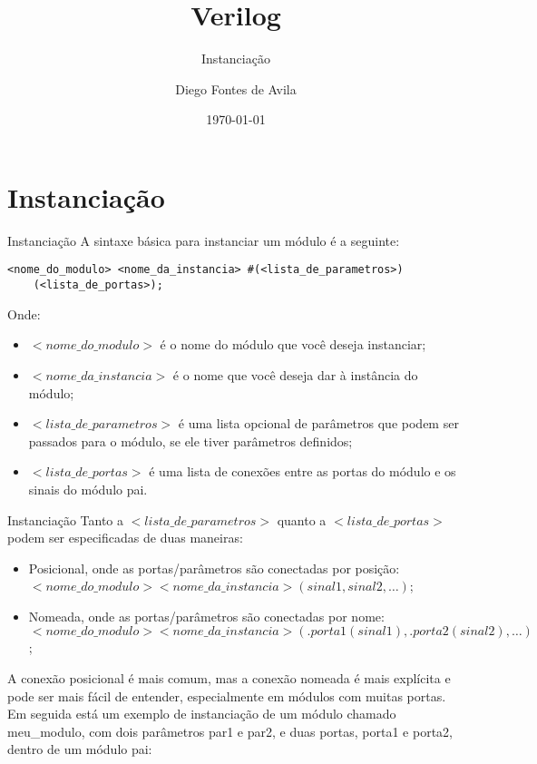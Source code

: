 \documentclass[aspectratio=169,xcolor=dvipsnames]{beamer}
\title{Verilog}
\subtitle{Instanciação}
\author{Diego Fontes de Avila}
\institute
{
    Poliware \\
    Escola Politécnica da Universidade de São Paulo %
}
\date{\today} %
\begin{document}
\begin{frame}
    \titlepage
\end{frame}

\section{Instanciação}

\begin{frame}[fragile]{Instanciação}
    A sintaxe básica para instanciar um módulo é a seguinte:

        \begin{block}{}
        \begin{verbatim}
<nome_do_modulo> <nome_da_instancia> #(<lista_de_parametros>)
    (<lista_de_portas>);
        \end{verbatim}
    \end{block}

    Onde:
    \begin{itemize}
        \item $<nome\_do\_modulo>$ é o nome do módulo que você deseja instanciar;
        \item $<nome\_da\_instancia>$ é o nome que você deseja dar à instância do módulo;
        \item $<lista\_de\_parametros>$ é uma lista opcional de parâmetros que podem ser passados para o módulo, se ele tiver parâmetros definidos;
        \item $<lista\_de\_portas>$ é uma lista de conexões entre as portas do módulo e os sinais do módulo pai.
    \end{itemize}

\end{frame}

\begin{frame}{Instanciação}
    Tanto a $<lista\_de\_parametros>$ quanto a $<lista\_de\_portas>$ podem ser especificadas de duas maneiras:
    \begin{itemize}
        \item Posicional, onde as portas/parâmetros são conectadas por posição: $<nome\_do\_modulo> <nome\_da\_instancia> (sinal1, sinal2, …)$;
        \item Nomeada, onde as portas/parâmetros são conectadas por nome: $<nome\_do\_modulo> <nome\_da\_instancia> (.porta1(sinal1), .porta2(sinal2), …)$;
    \end{itemize}
    A conexão posicional é mais comum, mas a conexão nomeada é mais explícita e pode ser mais fácil de entender, especialmente em módulos com muitas portas. Em seguida está um exemplo de instanciação de um módulo chamado meu_modulo, com dois parâmetros par1 e par2, e duas portas, porta1 e porta2, dentro de um módulo pai:
\end{frame}
\end{document}
